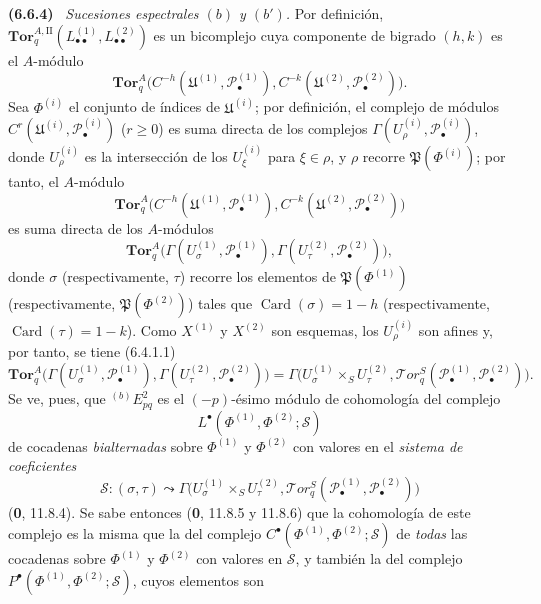 \documentclass[10pt,oneside]{book}
\newcommand{\oldpage}[2][]{\setcounter{footnote}{0}\marginpar{\scriptsize\textbf{#1}~|~#2}\ignorespaces}
\newenvironment{env}[1][]{\par\medskip\noindent\textbf{(#1)}\ }{\par}
\begin{document}
\begin{env}[6.6.4]
\label{III.6.6.4}
\emph{Sucesiones espectrales $(b)$ y $(b')$.} Por definición,
$\mathbf{Tor}_q^{A,\mathrm{II}}
(L_{\bullet\bullet}^{(1)},L_{\bullet\bullet}^{(2)})$ es un bicomplejo cuya
componente de bigrado $(h,k)$ es el $A$-módulo
\[
  \mathbf{Tor}_q^A
  \bigl(C^{-h}(\mathfrak U^{(1)},\mathscr P_\bullet^{(1)}),
        C^{-k}(\mathfrak U^{(2)},\mathscr P_\bullet^{(2)})\bigr).
\]
Sea $\Phi^{(i)}$ el conjunto de índices de $\mathfrak U^{(i)}$; por
definición, el complejo de módulos
$C^r(\mathfrak U^{(i)},\mathscr P_\bullet^{(i)})$ ($r\geqslant0$) es suma
directa de los complejos
$\Gamma(U_\rho^{(i)},\mathscr P_\bullet^{(i)})$, donde $U_\rho^{(i)}$ es la
intersección de los $U_\xi^{(i)}$ para $\xi\in\rho$, y $\rho$ recorre
$\mathfrak P(\Phi^{(i)})$; por tanto, el $A$-módulo
\[
  \mathbf{Tor}_q^A
  \bigl(C^{-h}(\mathfrak U^{(1)},\mathscr P_\bullet^{(1)}),
        C^{-k}(\mathfrak U^{(2)},\mathscr P_\bullet^{(2)})\bigr)
\]
es suma directa de los $A$-módulos
\[
  \mathbf{Tor}_q^A
  \bigl(\Gamma(U_\sigma^{(1)},\mathscr P_\bullet^{(1)}),
        \Gamma(U_\tau^{(2)},\mathscr P_\bullet^{(2)})\bigr),
\]
donde $\sigma$ (respectivamente, $\tau$) recorre los elementos de
$\mathfrak P(\Phi^{(1)})$ (respectivamente, $\mathfrak P(\Phi^{(2)})$) tales
que $\operatorname{Card}(\sigma)=1-h$ (respectivamente,
$\operatorname{Card}(\tau)=1-k$). Como $X^{(1)}$ y $X^{(2)}$ son
esquemas, los $U_\rho^{(i)}$ son afines y, por tanto, se tiene (6.4.1.1)
\[
  \mathbf{Tor}_q^A
  \bigl(\Gamma(U_\sigma^{(1)},\mathscr P_\bullet^{(1)}),
        \Gamma(U_\tau^{(2)},\mathscr P_\bullet^{(2)})\bigr)
  =\Gamma\bigl(U_\sigma^{(1)}\times_S U_\tau^{(2)},
    \mathscr{T}\!or_q^S
    (\mathscr P_\bullet^{(1)},\mathscr P_\bullet^{(2)})\bigr).
\]
\oldpage[III]{155}
Se ve, pues, que ${}^{(b)}E_{pq}^2$ es el $(-p)$-ésimo módulo de
cohomología del complejo
\[
  L^\bullet(\Phi^{(1)},\Phi^{(2)};\mathscr S)
\]
de cocadenas \emph{bialternadas} sobre $\Phi^{(1)}$ y $\Phi^{(2)}$ con valores en el
\emph{sistema de coeficientes}
\[
  \mathscr S:(\sigma,\tau)\leadsto
  \Gamma\bigl(U_\sigma^{(1)}\times_S U_\tau^{(2)},
    \mathscr{T}\!or_q^S
    (\mathscr P_\bullet^{(1)},\mathscr P_\bullet^{(2)})\bigr)
\]
(\textbf{0}, 11.8.4). Se sabe entonces (\textbf{0}, 11.8.5 y
11.8.6) que la cohomología de este complejo es la misma que la del complejo
$C^\bullet(\Phi^{(1)},\Phi^{(2)};\mathscr S)$ de \emph{todas} las cocadenas sobre
$\Phi^{(1)}$ y $\Phi^{(2)}$ con valores en $\mathscr S$, y también la del
complejo $P^\bullet(\Phi^{(1)},\Phi^{(2)};\mathscr S)$, cuyos elementos son

\end{env}
\end{document}
